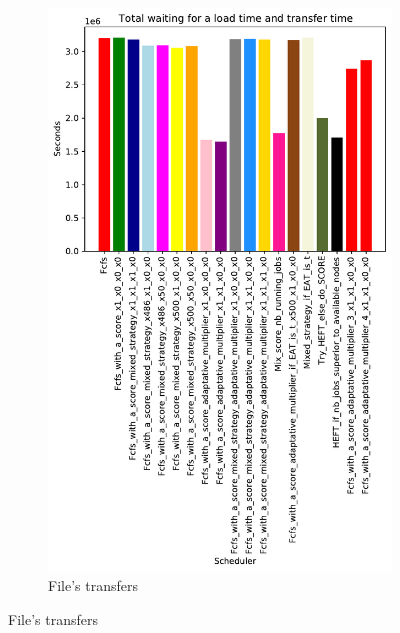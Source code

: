 \documentclass[a4paper]{article}
\begin{document}
\begin{figure}[H]
\begin{subfigure}[b]{0.4\linewidth}\centering\includegraphics[width=0.9\linewidth]{MBSS/plot/Results_FCFS_Score_Adaptative_Multiplier_2022-01-21->2022-01-21_V9271_Total_waiting_for_a_load_time_and_transfer_time_450_128_32_256_4_1024.pdf}\caption{File's transfers}\end{subfigure}

\end{figure}
\end{document}

